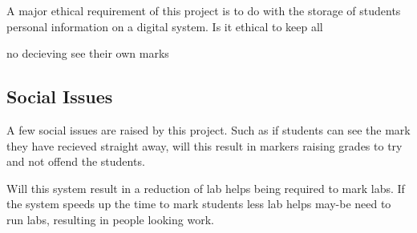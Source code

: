 \documentclass[12pt]{article}  %
\theoremstyle{definition}
\theoremstyle{remark}
\begin{document}
A major ethical requirement of this project is to do with the storage of students personal information on a digital system. Is it ethical to keep all 

no decieving see their own marks

\subsection{Social Issues}

A few social issues are raised by this project. Such as if students can see the mark they have recieved straight away, will this result in markers raising grades to try and not offend the students.

Will this system result in a reduction of lab helps being required to mark labs. If the system speeds up the time to mark students less lab helps may-be need to run labs, resulting in people looking work.




\newpage


\end{document}
